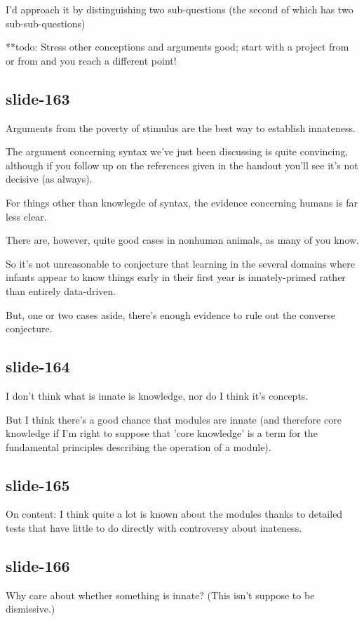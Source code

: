 \documentclass[12pt,\papersize]{extarticle}
\begin{document}
I'd approach it by distinguishing two sub-questions (the second of which has two sub-sub-questions)

**todo: Stress other conceptions and arguments good; start with a project from \citet{spelke:2012_core} or from \citet{haun:2010_origins} and you reach a different point!

\subsection{slide-163}
Arguments from the poverty of stimulus are the best way to establish innateness.

The argument concerning syntax we've just been discussing is quite convincing, although if you follow up on the references given in the handout you'll see it's not decisive (as always).

For things other than knowlegde of syntax, the evidence concerning humans is far less clear.

There are, however, quite good cases in nonhuman animals, as many of you know.

So it's not unreasonable to conjecture that learning in the several domains where infants appear to know things early in their first year is innately-primed rather than entirely data-driven.

But, one or two cases aside, there's enough evidence to rule out the converse conjecture.

\subsection{slide-164}
I don't think what is innate is knowledge, nor do I think it's concepts.

But I think there's a good chance that modules are innate (and therefore core knowledge if I'm right to suppose that 'core knowledge' is a term for the fundamental principles describing the operation of a module).

\subsection{slide-165}
On content: I think quite a lot is known about the modules thanks to detailed tests that have little to do directly with controversy about inateness.

\subsection{slide-166}
Why care about whether something is innate?  (This isn't suppose to be dismissive.)
\end{document}
